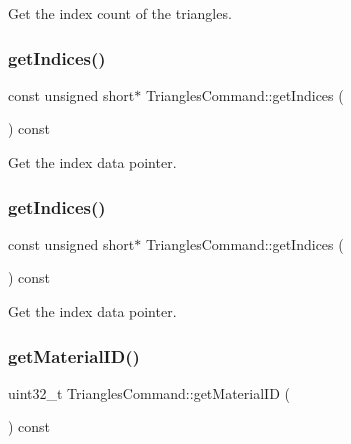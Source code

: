 Get the index count of the triangles. \mbox{\label{classTrianglesCommand_a00f3fe880696bafdfc7ec8fc76e405b4}} 
\subsubsection{\texorpdfstring{get\+Indices()}{getIndices()}\hspace{0.1cm}{\footnotesize\ttfamily [1/2]}}
{\footnotesize\ttfamily const unsigned short$\ast$ Triangles\+Command\+::get\+Indices (\begin{DoxyParamCaption}{ }\end{DoxyParamCaption}) const\hspace{0.3cm}{\ttfamily [inline]}}

Get the index data pointer. \mbox{\label{classTrianglesCommand_a00f3fe880696bafdfc7ec8fc76e405b4}} 
\subsubsection{\texorpdfstring{get\+Indices()}{getIndices()}\hspace{0.1cm}{\footnotesize\ttfamily [2/2]}}
{\footnotesize\ttfamily const unsigned short$\ast$ Triangles\+Command\+::get\+Indices (\begin{DoxyParamCaption}{ }\end{DoxyParamCaption}) const\hspace{0.3cm}{\ttfamily [inline]}}

Get the index data pointer. \mbox{\label{classTrianglesCommand_a3a2a112f8201abffa602503c5b612d36}} 
\subsubsection{\texorpdfstring{get\+Material\+I\+D()}{getMaterialID()}\hspace{0.1cm}{\footnotesize\ttfamily [1/2]}}
{\footnotesize\ttfamily uint32\+\_\+t Triangles\+Command\+::get\+Material\+ID (\begin{DoxyParamCaption}{ }\end{DoxyParamCaption}) const\hspace{0.3cm}{\ttfamily [inline]}}

